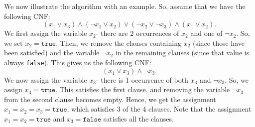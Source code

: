 \documentclass[a4paper, openany]{memoir}
\begin{document}
    We now illustrate the algorithm with an example. So, assume that we have the following CNF:
    \[(x_1 \lor x_3) \land (\lnot x_1 \lor x_2) \lor (\lnot x_2 \lor \lnot x_3) \land (x_1 \lor x_2).\]
    We first assign the variable $x_2$- there are 2 occurrences of $x_2$ and one of $\lnot x_2$. So, we set $x_2 = \texttt{true}$. Then, we remove the clauses containing $x_2$ (since those have been satisfied) and the variable $\lnot x_2$ in the remaining clauses (since that value is always \texttt{false}). This gives us the following CNF:
    \[(x_1 \lor x_3) \land \lnot x_3.\]
    We now assign the variable $x_3$- there is 1 occurrence of both $x_3$ and $\lnot x_3$. So, we assign $x_3 = \texttt{true}$. This satisfies the first clause, and removing the variable $\lnot x_3$ from the second clause becomes empty. Hence, we get the assignment $x_1 = x_2 = x_3 = \texttt{true}$, which satisfies 3 of the 4 clauses. Note that the assignment $x_1 = x_2 = \texttt{true}$ and $x_3 = \texttt{false}$ satisfies all the clauses.
\end{document}
